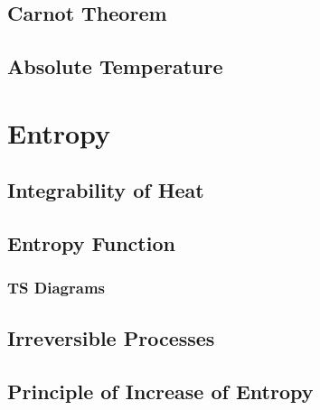 \documentclass[../qm.tex]{subfiles}
\begin{document}
\subsection{Carnot Theorem}
\subsection{Absolute Temperature}
\section{Entropy}
\subsection{Integrability of Heat}
\subsection{Entropy Function}
\subsubsection{TS Diagrams}
\subsection{Irreversible Processes}
\subsection{Principle of Increase of Entropy}
\end{document}
